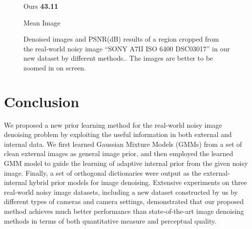 \begin{figure}[t!]
{\begin{minipage}[t]{0.19\textwidth}
{\footnotesize Ours \textbf{43.11}}
\end{minipage}
\begin{minipage}[t]{0.19\textwidth}
\centering
{}
{\footnotesize Mean Image}
\end{minipage}
}\vspace{-3mm}
    \caption{Denoised images and PSNR(dB) results of a region cropped from the real-world noisy image ``SONY A7II ISO 6400 DSC03017'' in our new dataset by different methods.. The images are better to be zoomed in on screen.}
    \label{fig3-20}
\end{figure}


\section{Conclusion}

We proposed a new prior learning method for the real-world noisy image denoising problem by exploiting the useful information in both external and internal data. We first learned Gaussian Mixture Models (GMMs) from a set of clean external images as general image prior, and then employed the learned GMM model to guide the learning of adaptive internal prior from the given noisy image. Finally, a set of orthogonal dictionaries were output as the external-internal hybrid prior models for image denoising. Extensive experiments on three real-world noisy image datasets, including a new dataset constructed by us by different types of cameras and camera settings, demonstrated that our proposed method achieves much better performance than state-of-the-art image denoising methods in terms of both quantitative measure and perceptual quality.



